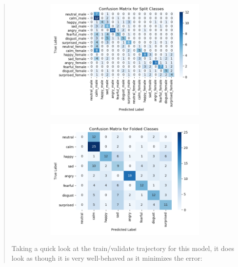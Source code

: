 \documentclass{article}
\begin{document}
\begin{quote}
	\begin{figure}[h!]
		\centering
		\begin{subfigure}[h]{0.45\textwidth}
			\includegraphics[width=\textwidth]{figs/final_conf_raw.png}
		\end{subfigure}
		\begin{subfigure}[h]{0.45\textwidth}
			\includegraphics[width=\textwidth]{figs/final_conf_folded.png}
		\end{subfigure}
	\end{figure}

Taking a quick look at the train/validate trajectory for this model, it does look as though it is very well-behaved as it minimizes the error:


\end{quote}
\end{document}
